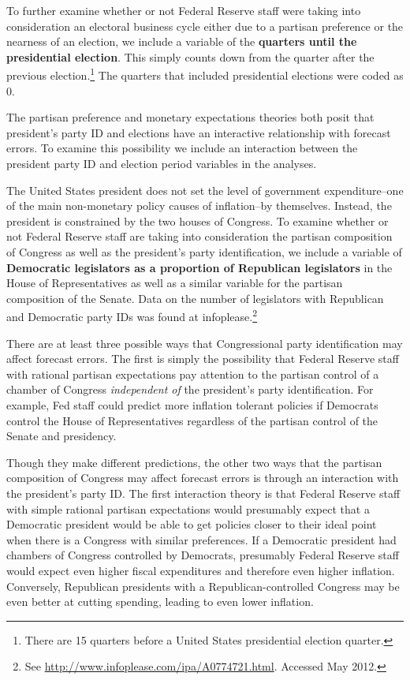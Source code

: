\documentclass[a4paper]{article}
\begin{document}
To further examine whether or not Federal Reserve staff were taking into consideration an electoral business cycle either due to a partisan preference or the nearness of an election, we include a variable of the {\bf{quarters until the presidential election}}. This simply counts down from the quarter after the previous election.\footnote{There are 15 quarters before a United States presidential election quarter.} The quarters that included presidential elections were coded as 0. 

The partisan preference and monetary expectations theories both posit that president's party ID and elections have an interactive relationship with forecast errors. To examine this possibility we include an interaction between the president party ID and election period variables in the analyses.

The United States president does not set the level of government expenditure--one of the main non-monetary policy causes of inflation--by themselves. Instead, the president is constrained by the two houses of Congress. To examine whether or not Federal Reserve staff are taking into consideration the partisan composition of Congress as well as the president's party identification, we include a variable of {\bf{Democratic legislators as a proportion of Republican legislators}} in the House of Representatives as well as a similar variable for the partisan composition of the Senate. Data on the number of legislators with Republican and Democratic party IDs was found at infoplease.\footnote{See {\url{http://www.infoplease.com/ipa/A0774721.html}}. Accessed May 2012.} 

There are at least three possible ways that Congressional party identification may affect forecast errors. The first is simply the possibility that Federal Reserve staff with rational partisan expectations pay attention to the partisan control of a chamber of Congress {\emph{independent of}} the president's party identification.  For example, Fed staff could predict more inflation tolerant policies if Democrats control the House of Representatives regardless of the partisan control of the Senate and presidency.

Though they make different predictions, the other two ways that the partisan composition of Congress may affect forecast errors is through an interaction with the president's party ID. The first interaction theory is that Federal Reserve staff with simple rational partisan expectations would presumably expect that a Democratic president would be able to get policies closer to their ideal point when there is a Congress with similar preferences. If a Democratic president had chambers of Congress controlled by Democrats, presumably Federal Reserve staff would expect even higher fiscal expenditures and therefore even higher inflation. Conversely, Republican presidents with a Republican-controlled Congress may be even better at cutting spending, leading to even lower inflation.
\end{document}
